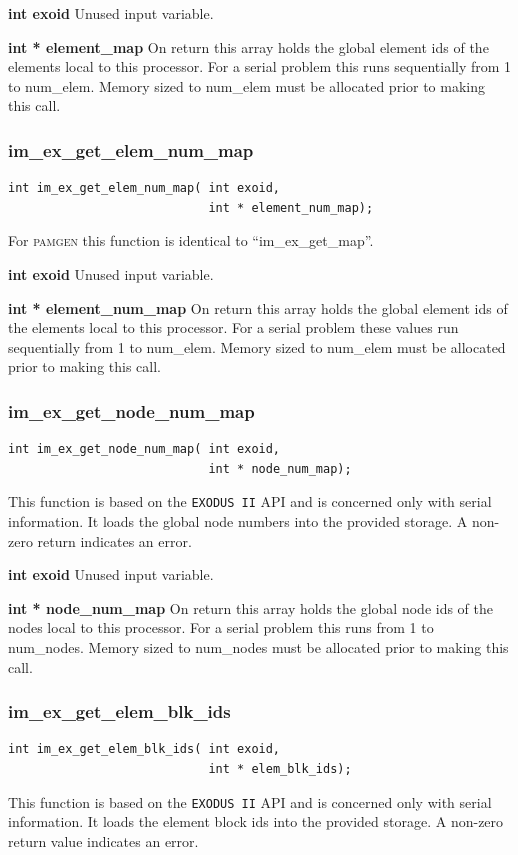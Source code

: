 {\setlength{\parindent}{0pt}
 \textbf{int exoid} Unused input variable.}

{\setlength{\parindent}{0pt}
 \textbf{int * element\_map} On return this array holds the global element ids of the elements local to this processor. For a serial problem this runs sequentially from 1 to num\_elem. Memory sized to num\_elem must be allocated prior to making this call.}

\subsubsection{im\_ex\_get\_elem\_num\_map}
{\ttfamily  \begin{verbatim}
int im_ex_get_elem_num_map( int exoid,
                            int * element_num_map);
\end{verbatim}}
For \textsc{pamgen} this function is identical to ``im\_ex\_get\_map''.

{\setlength{\parindent}{0pt}
 \textbf{int exoid} Unused input variable.}

{\setlength{\parindent}{0pt}
 \textbf{int * element\_num\_map}  On return this array holds the global element ids of the elements local to this processor. For a serial problem these values run sequentially from 1 to num\_elem. Memory sized to num\_elem must be allocated prior to making this call.}

\subsubsection{im\_ex\_get\_node\_num\_map}
{\ttfamily  \begin{verbatim}
int im_ex_get_node_num_map( int exoid,
                            int * node_num_map);
\end{verbatim}}
This function is based on the \texttt{EXODUS II} API and is concerned only with serial information. It loads the global node numbers into the provided storage. A non-zero return indicates an error.

{\setlength{\parindent}{0pt}
 \textbf{int exoid} Unused input variable.}

{\setlength{\parindent}{0pt}
 \textbf{int * node\_num\_map}  On return this array holds the global node ids of the nodes local to this processor. For a serial problem this runs from 1 to num\_nodes. Memory sized to num\_nodes must be allocated prior to making this call.}
\subsubsection{im\_ex\_get\_elem\_blk\_ids}
{\ttfamily  \begin{verbatim}
int im_ex_get_elem_blk_ids( int exoid,
                            int * elem_blk_ids);
\end{verbatim}}
This function is based on the \texttt{EXODUS II} API and is concerned only with serial information. It loads the element block ids into the provided storage. A non-zero return value indicates an error.


